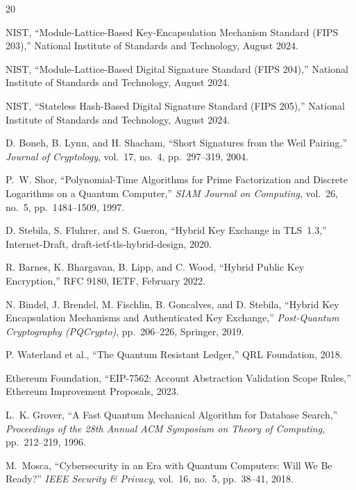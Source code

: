 \documentclass[11pt,a4paper]{article}
\begin{document}
\begin{thebibliography}{20}

NIST, ``Module-Lattice-Based Key-Encapsulation Mechanism Standard (FIPS 203),''
National Institute of Standards and Technology, August 2024.

NIST, ``Module-Lattice-Based Digital Signature Standard (FIPS 204),''
National Institute of Standards and Technology, August 2024.

NIST, ``Stateless Hash-Based Digital Signature Standard (FIPS 205),''
National Institute of Standards and Technology, August 2024.

D. Boneh, B. Lynn, and H. Shacham, ``Short Signatures from the Weil Pairing,''
\emph{Journal of Cryptology}, vol.~17, no.~4, pp.~297--319, 2004.

P.~W. Shor, ``Polynomial-Time Algorithms for Prime Factorization and Discrete
Logarithms on a Quantum Computer,'' \emph{SIAM Journal on Computing}, vol.~26,
no.~5, pp.~1484--1509, 1997.

D. Stebila, S. Fluhrer, and S. Gueron, ``Hybrid Key Exchange in TLS~1.3,''
Internet-Draft, draft-ietf-tls-hybrid-design, 2020.

R. Barnes, K. Bhargavan, B. Lipp, and C. Wood, ``Hybrid Public Key Encryption,''
RFC 9180, IETF, February 2022.

N. Bindel, J. Brendel, M. Fischlin, B. Goncalves, and D. Stebila, ``Hybrid Key
Encapsulation Mechanisms and Authenticated Key Exchange,'' \emph{Post-Quantum
Cryptography (PQCrypto)}, pp.~206--226, Springer, 2019.

P. Waterland et al., ``The Quantum Resistant Ledger,'' QRL Foundation, 2018.

Ethereum Foundation, ``EIP-7562: Account Abstraction Validation Scope Rules,''
Ethereum Improvement Proposals, 2023.

L.~K. Grover, ``A Fast Quantum Mechanical Algorithm for Database Search,''
\emph{Proceedings of the 28th Annual ACM Symposium on Theory of Computing},
pp.~212--219, 1996.

M.~Mosca, ``Cybersecurity in an Era with Quantum Computers: Will We Be Ready?''
\emph{IEEE Security \& Privacy}, vol.~16, no.~5, pp.~38--41, 2018.

\end{thebibliography}
\end{document}

